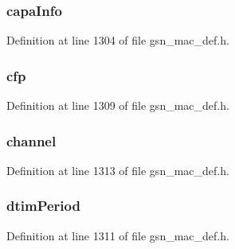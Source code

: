 \hypertarget{a00111_a93b70bbe7c4ccf4b9191d92dc739c6ea}{
\subsubsection[{capaInfo}]{ {\bf capaInfo}}}
\label{a00111_a93b70bbe7c4ccf4b9191d92dc739c6ea}


Definition at line 1304 of file gsn\_\-mac\_\-def.h.

\hypertarget{a00111_a6cf19925453191cd0f21e42cbac86eb7}{
\subsubsection[{cfp}]{ {\bf cfp}}}
\label{a00111_a6cf19925453191cd0f21e42cbac86eb7}


Definition at line 1309 of file gsn\_\-mac\_\-def.h.

\hypertarget{a00111_a52d69a3bd7bdfdfc6f9e40f4962c575d}{
\subsubsection[{channel}]{ {\bf channel}}}
\label{a00111_a52d69a3bd7bdfdfc6f9e40f4962c575d}


Definition at line 1313 of file gsn\_\-mac\_\-def.h.

\hypertarget{a00111_a299cd846e383cf8f77d0c2e71083caba}{
\subsubsection[{dtimPeriod}]{ {\bf dtimPeriod}}}
\label{a00111_a299cd846e383cf8f77d0c2e71083caba}


Definition at line 1311 of file gsn\_\-mac\_\-def.h.

